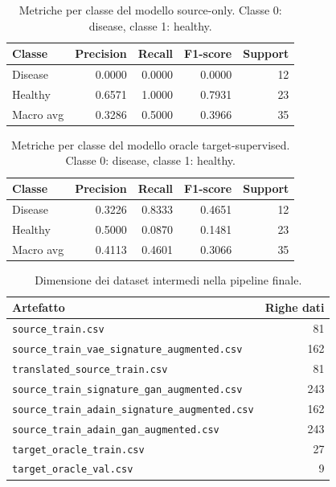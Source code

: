 \documentclass[12pt,a4paper]{article}
\begin{document}
\begin{table}[H]
\centering
\caption{Metriche per classe del modello source-only. Classe 0: disease, classe 1: healthy.}
\begin{tabular}{lrrrr}
\toprule
Classe & Precision & Recall & F1-score & Support \\
\midrule
Disease & 0.0000 & 0.0000 & 0.0000 & 12 \\
Healthy & 0.6571 & 1.0000 & 0.7931 & 23 \\
\midrule
Macro avg & 0.3286 & 0.5000 & 0.3966 & 35 \\
\bottomrule
\end{tabular}
\end{table}

\begin{table}[H]
\centering
\caption{Metriche per classe del modello oracle target-supervised. Classe 0: disease, classe 1: healthy.}
\begin{tabular}{lrrrr}
\toprule
Classe & Precision & Recall & F1-score & Support \\
\midrule
Disease & 0.3226 & 0.8333 & 0.4651 & 12 \\
Healthy & 0.5000 & 0.0870 & 0.1481 & 23 \\
\midrule
Macro avg & 0.4113 & 0.4601 & 0.3066 & 35 \\
\bottomrule
\end{tabular}
\end{table}

\begin{table}[H]
\centering
\caption{Dimensione dei dataset intermedi nella pipeline finale.}
\begin{tabular}{p{}r}
\toprule
Artefatto & Righe dati \\
\midrule
\texttt{source\_train.csv} & 81 \\
\texttt{source\_train\_vae\_signature\_augmented.csv} & 162 \\
\texttt{translated\_source\_train.csv} & 81 \\
\texttt{source\_train\_signature\_gan\_augmented.csv} & 243 \\
\texttt{source\_train\_adain\_signature\_augmented.csv} & 162 \\
\texttt{source\_train\_adain\_gan\_augmented.csv} & 243 \\
\texttt{target\_oracle\_train.csv} & 27 \\
\texttt{target\_oracle\_val.csv} & 9 \\
\bottomrule
\end{tabular}
\end{table}
\end{document}
